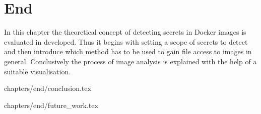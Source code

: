 \chapter{End}
\label{ch:end}
In this chapter the theoretical concept of detecting secrets in Docker images is evaluated in developed. 
Thus it begins with setting a scope of secrets to detect and then introduce which method has to be used to gain file access to images in general. Conclusively the process of image analysis is explained with the help of a suitable visualisation.

 {chapters/end/conclusion.tex}

 {chapters/end/future_work.tex}

